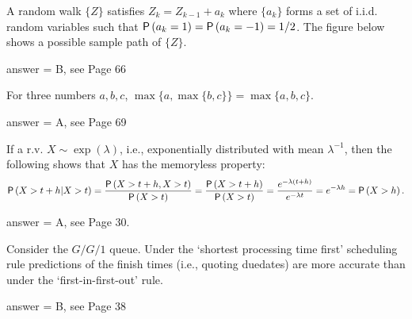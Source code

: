 \begin{exercise}[201802]
A random walk $\{Z\}$ satisfies $Z_k = Z_{k-1} + a_k$ where $\{a_k\}$ forms a set of i.i.d. random variables such that $\P{a_k=1}=\P{a_k=-1}=1/2$.  The figure below shows a possible sample path of $\{Z\}$.
%
%
\begin{solution}
answer = B, see Page 66
\end{solution}
\end{exercise}

\begin{exercise}[201802]
For three numbers $a,b,c$, $\max\{a, \max\{b, c\}\} = \max\{a, b, c\}$. 
\begin{solution}
answer = A, see Page 69
\end{solution}
\end{exercise}

\begin{exercise}[201802]
If a r.v. $X\sim\exp(\lambda)$, i.e., exponentially distributed with mean $\lambda^{-1}$, then the following shows that $X$ has the memoryless  property:
\begin{equation*}
  \P{X>t+h|X>t} = \frac{\P{X>t+h, X>t}}{\P{X>t}} = \frac{\P{X>t+h}}{\P{X>t}} = \frac{e^{-\lambda(t+h)}}{e^{-\lambda t}} = e^{-\lambda h} = \P{X>h}.
\end{equation*}

\begin{solution}
answer = A, see Page 30. 
\end{solution}
\end{exercise}

\begin{exercise}[201803]
Consider the $G/G/1$ queue. Under the `shortest processing time first' scheduling rule predictions of the finish times (i.e., quoting duedates) are more accurate than under the `first-in-first-out' rule.
\begin{solution}
answer = B, see Page 38
\end{solution}
\end{exercise}

